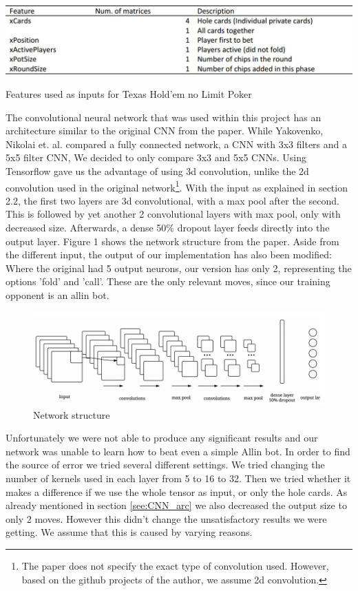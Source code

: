 \documentclass[]{report}
\begin{document}
\begin{table}
\includegraphics[scale=0.5]{Features.JPG}

\caption{Features used as inputs for Texas Hold'em no Limit Poker \label{tab:tensor}}

\end{table}


The convolutional neural network that was used within this project has an architecture similar to the original CNN from the paper\cite{1}. While Yakovenko, Nikolai et. al. compared a fully connected network, a CNN with 3x3 filters and a 5x5 filter CNN, We decided to only compare 3x3 and 5x5 CNNs. Using Tensorflow gave us the advantage of using 3d convolution, unlike the 2d convolution used in the original network\footnote{The paper does not specify the exact type of convolution used. However, based on the github projects of the author, we assume 2d convolution.}. With the input as explained in section 2.2, the first two layers are 3d convolutional, with a max pool after the second. This is followed by yet another 2 convolutional layers with max pool, only with decreased size. 
Afterwards, a dense 50\% dropout layer feeds directly into the output layer. Figure 1 shows the network structure from the paper. Aside from the different input, the output of our implementation has also been modified: Where the original had 5 output neurons, our version has only 2, representing the options 'fold' and 'call'. These are the only relevant moves, since our training opponent is an allin bot.


\begin{figure}[h]
	\caption{Network structure}
	\includegraphics[scale = 0.5]{cnn_structure.jpg}
\end{figure}

Unfortunately we were not able to produce any significant results
and our network was unable to learn how to beat even a simple Allin
bot. In order to find the source of error we tried several different
settings. We tried changing the number of kernels used in each layer
from 5 to 16 to 32. Then we tried whether it makes a difference if
we use the whole tensor as input, or only the hole cards. As already
mentioned in section \ref{see:CNN_arc} we also decreased the output
size to only 2 moves. However this didn't change the unsatisfactory
results we were getting. We assume that this is caused by varying
reasons. 
\end{document}
